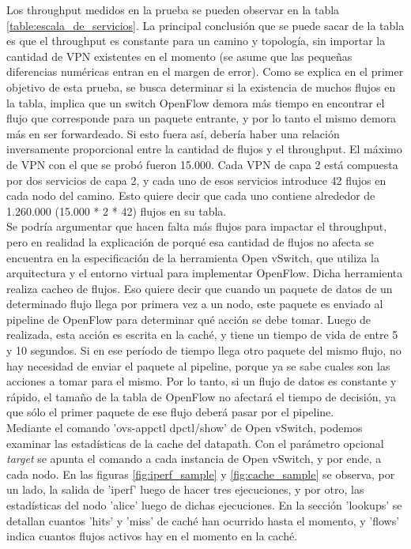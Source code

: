 Los throughput medidos en la prueba se pueden observar en la tabla \ref{table:escala_de_servicios}. La principal conclusión que se puede sacar de la tabla es que el throughput es constante para un camino y topología, sin importar la cantidad de VPN existentes en el momento (se asume que las pequeñas diferencias numéricas entran en el margen de error). Como se explica en el primer objetivo de esta prueba, se busca determinar si la existencia de muchos flujos en la tabla, implica que un switch OpenFlow demora más tiempo en encontrar el flujo que corresponde para un paquete entrante, y por lo tanto el mismo demora más en ser forwardeado. Si esto fuera así, debería haber una relación inversamente proporcional entre la cantidad de flujos y el throughput. El máximo de VPN con el que se probó fueron 15.000. Cada VPN de capa 2 está compuesta por dos servicios de capa 2, y cada uno de esos servicios introduce 42 flujos en cada nodo del camino. Esto quiere decir que cada uno contiene alrededor de 1.260.000 (15.000 * 2 * 42) flujos en su tabla. \\
Se podría argumentar que hacen falta más flujos para impactar el throughput, pero en realidad la explicación de porqué esa cantidad de flujos no afecta se encuentra en la especificación de la herramienta Open vSwitch, que utiliza la arquitectura y el entorno virtual para implementar OpenFlow. Dicha herramienta realiza cacheo de flujos. Eso quiere decir que cuando un paquete de datos de un determinado flujo llega por primera vez a un nodo, este paquete es enviado al pipeline de OpenFlow para determinar qué acción se debe tomar. Luego de realizada, esta acción es escrita en la caché, y tiene un tiempo de vida de entre 5 y 10 segundos. Si en ese período de tiempo llega otro paquete del mismo flujo, no hay necesidad de enviar el paquete al pipeline, porque ya se sabe cuales son las acciones a tomar para el mismo. Por lo tanto, si un flujo de datos es constante y rápido, el tamaño de la tabla de OpenFlow no afectará el tiempo de decisión, ya que sólo el primer paquete de ese flujo deberá pasar por el pipeline. \\
Mediante el comando 'ovs-appctl dpctl/show' de Open vSwitch, podemos examinar las estadísticas de la cache del datapath. Con el parámetro opcional \textit{target} se apunta el comando a cada instancia de Open vSwitch, y por ende, a cada nodo. En las figuras \ref{fig:iperf_sample} y \ref{fig:cache_sample} se observa, por un lado, la salida de 'iperf' luego de hacer tres ejecuciones, y por otro, las estadísticas del nodo 'alice' luego de dichas ejecuciones. En la sección 'lookups' se detallan cuantos 'hits' y 'miss' de caché han ocurrido hasta el momento, y 'flows' indica cuantos flujos activos hay en el momento en la caché. \\ \\

